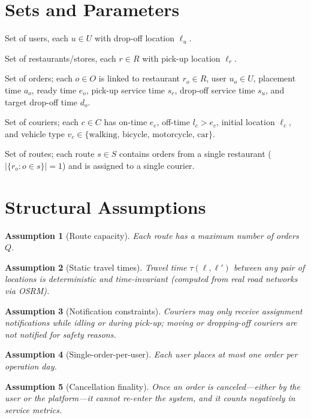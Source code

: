 \documentclass[12pt,a4paper]{report}
\newtheorem{assumption}{Assumption}
\begin{document}
\section{Sets and Parameters}

\begin{description}[leftmargin=2cm,style=nextline]
    \item[$U$] Set of users, each $u \in U$ with drop-off location $\ell_u$.
    \item[$R$] Set of restaurants/stores, each $r \in R$ with pick-up location $\ell_r$.
    \item[$O$] Set of orders; each $o \in O$ is linked to restaurant $r_o \in R$, user $u_o \in U$, placement time $a_o$, ready time $e_o$, pick-up service time $s_r$, drop-off service time $s_u$, and target drop-off time $d_o$.
    \item[$C$] Set of couriers; each $c \in C$ has on-time $e_c$, off-time $l_c > e_c$, initial location $\ell_c$, and vehicle type $v_c \in \{\text{walking, bicycle, motorcycle, car}\}$.
    \item[$S$] Set of routes; each route $s \in S$ contains orders from a single restaurant ($|\{r_o : o \in s\}| = 1$) and is assigned to a single courier.
\end{description}

\section{Structural Assumptions}
\label{sec:assumptions}

\begin{assumption}[Route capacity] Each route has a maximum number of orders $Q$.
\end{assumption}
\begin{assumption}[Static travel times] Travel time $\tau(\ell,\ell')$ between any pair of locations is deterministic and time-invariant (computed from real road networks via OSRM).
\end{assumption}
\begin{assumption}[Notification constraints] Couriers may only receive assignment notifications while idling or during pick-up; moving or dropping-off couriers are not notified for safety reasons.
\end{assumption}
\begin{assumption}[Single-order-per-user] Each user places at most one order per operation day.
\end{assumption}
\begin{assumption}[Cancellation finality] Once an order is canceled---either by the user or the platform---it cannot re-enter the system, and it counts negatively in service metrics.
\end{assumption}
\end{document}
